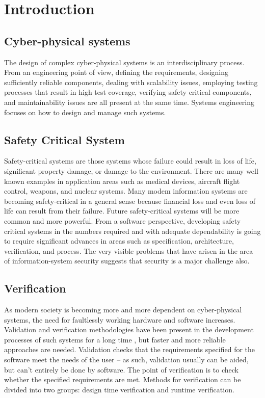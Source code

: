 \chapter{Introduction}
\label{chap:intro}

\section{Cyber-physical systems}

The design of complex cyber-physical systems is an interdisciplinary process. From an engineering point of view, defining the requirements, designing sufficiently reliable components, dealing with scalability issues, employing testing processes that result in high test coverage, verifying safety critical components, and maintainability issues are all present at the same time. Systems engineering focuses on how to design and manage such systems. \cite{randomwikipedialink1} \cite{randomwikipedialink2}

\section{Safety Critical System}

Safety-critical systems are those systems whose failure could result in loss of life, significant property damage, or damage to the environment. There are many well known examples in application areas such as medical devices, aircraft flight control, weapons, and nuclear systems. Many modem information systems are becoming safety-critical in a general sense because financial loss and even loss of life can result from their failure. Future safety-critical systems will be more common and more powerful. From a software perspective, developing safety critical systems in the numbers required and with adequate dependability is going to require significant advances in areas such as specification, architecture, verification, and process. The very visible problems that have arisen in the area of information-system security suggests that security is a major challenge also. \cite{safetycritical}

\section{Verification}

As modern society is becoming more and more dependent on cyber-physical systems, the need for faultlessly working hardware and software increases. Validation and verification methodologies have been present in the development processes of such systems for a long time \citep{ieee1012}, but faster and more reliable approaches are needed. Validation checks that the requirements specified for the software meet the needs of the user -- as such, validation usually can be aided, but can’t entirely be done by software. The point of verification is to check whether the specified requirements are met. Methods for verification can be divided into two groups: design time verification and runtime verification.

